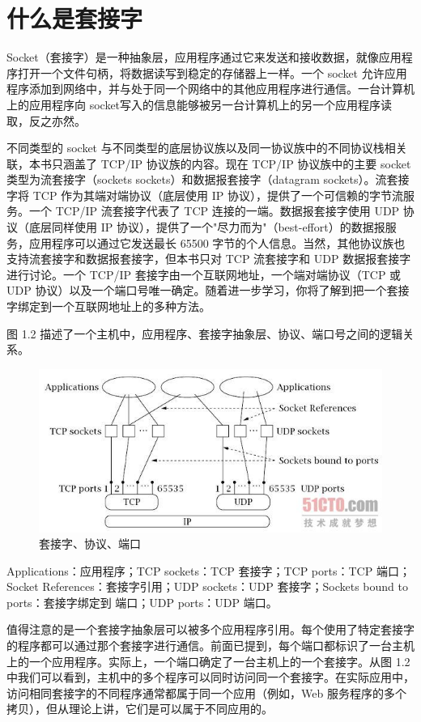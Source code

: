	\section{什么是套接字}

		Socket（套接字）是一种抽象层，应用程序通过它来发送和接收数据，就像应用程序打开一个文件句柄，将数据读写到稳定的存储器上一样。一个 socket 允许应用程序添加到网络中，并与处于同一个网络中的其他应用程序进行通信。一台计算机上的应用程序向 socket写入的信息能够被另一台计算机上的另一个应用程序读取，反之亦然。

		不同类型的 socket 与不同类型的底层协议族以及同一协议族中的不同协议栈相关联，本书只涵盖了 TCP/IP 协议族的内容。现在 TCP/IP 协议族中的主要 socket 类型为流套接字（sockets sockets）和数据报套接字（datagram sockets）。流套接字将 TCP 作为其端对端协议（底层使用 IP 协议），提供了一个可信赖的字节流服务。一个 TCP/IP 流套接字代表了 TCP 连接的一端。数据报套接字使用 UDP 协议（底层同样使用 IP 协议），提供了一个"尽力而为"（best-effort）的数据报服务，应用程序可以通过它发送最长 65500 字节的个人信息。当然，其他协议族也支持流套接字和数据报套接字，但本书只对 TCP 流套接字和 UDP 数据报套接字进行讨论。一个 TCP/IP 套接字由一个互联网地址，一个端对端协议（TCP 或 UDP 协议）以及一个端口号唯一确定。随着进一步学习，你将了解到把一个套接字绑定到一个互联网地址上的多种方法。

		图 1.2 描述了一个主机中，应用程序、套接字抽象层、协议、端口号之间的逻辑关系。

		\clearpage

		\begin{figure}[htbp]%
			\centering
			\includegraphics[scale=.6]{img/01.02.jpg}
			\caption{套接字、协议、端口}
			\label{fig:socket.trans}
		\end{figure}

		Applications：应用程序；TCP sockets：TCP 套接字；TCP ports：TCP 端口；Socket References：套接字引用；UDP sockets：UDP 套接字；Sockets bound to ports：套接字绑定到 端口；UDP ports：UDP 端口。

		值得注意的是一个套接字抽象层可以被多个应用程序引用。每个使用了特定套接字的程序都可以通过那个套接字进行通信。前面已提到，每个端口都标识了一台主机上的一个应用程序。实际上，一个端口确定了一台主机上的一个套接字。从图 1.2 中我们可以看到，主机中的多个程序可以同时访问同一个套接字。在实际应用中，访问相同套接字的不同程序通常都属于同一个应用（例如，Web 服务程序的多个拷贝），但从理论上讲，它们是可以属于不同应用的。


